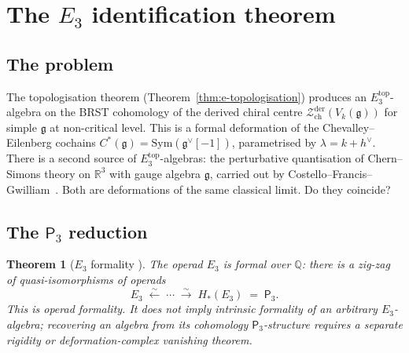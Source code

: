 \documentclass[11pt,reqno]{amsart}
\newtheorem{theorem}{Theorem}[section]
\theoremstyle{definition}
\theoremstyle{remark}
\providecommand{\cZ}{\mathcal{Z}}
\providecommand{\fg}{\mathfrak{g}}
\providecommand{\Ethree}{E_3}
\providecommand{\Pthree}{\mathsf{P}_3}
\providecommand{\bR}{\mathbb{R}}
\providecommand{\bQ}{\mathbb{Q}}
\providecommand{\Sym}{\mathrm{Sym}}
\begin{document}

\section{The $\Ethree$ identification theorem}
\label{sec:e3-identification}

\subsection{The problem}

The topologisation theorem
(Theorem~\ref{thm:e-topologisation}) produces an
$\Ethree^{\mathrm{top}}$-algebra on the BRST cohomology of
the derived chiral centre
$\cZ^{\mathrm{der}}_{\mathrm{ch}}(V_k(\fg))$ for simple
$\fg$ at non-critical level. This is a formal deformation of
the Chevalley--Eilenberg cochains
$C^*(\fg) = \Sym(\fg^\vee[-1])$, parametrised by
$\lambda = k + h^\vee$. There is a second source of
$\Ethree^{\mathrm{top}}$-algebras: the perturbative
quantisation of Chern--Simons theory on $\bR^3$ with gauge
algebra $\fg$, carried out by
Costello--Francis--Gwilliam~\cite{CFG25}. Both are
deformations of the same classical limit. Do they coincide?

\subsection{The $\Pthree$ reduction}

\begin{theorem}[$\Ethree$ formality
\textup{\cite{Kon99,Tamarkin03,FresseWillwacher20}}]
\label{thm:e-e3-formality}
The operad $\Ethree$ is formal over $\bQ$: there is a
zig-zag of quasi-isomorphisms of operads
\[
\Ethree
\;\xleftarrow{\sim}\; \cdots \;\xrightarrow{\sim}\;
H_*(\Ethree) \;=\; \Pthree.
\]
	This is operad formality. It does not imply intrinsic formality of
	an arbitrary $\Ethree$-algebra; recovering an algebra from its
	cohomology $\Pthree$-structure requires a separate rigidity or
	deformation-complex vanishing theorem.
\end{theorem}
\end{document}
